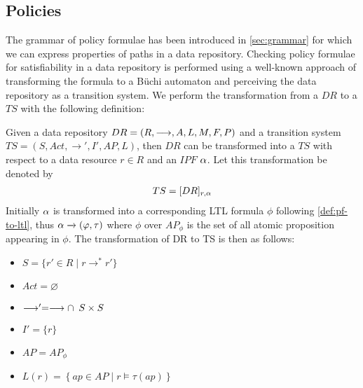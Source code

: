 \subsection{Policies}\label{sec:policies}
The grammar of policy formulae has been introduced in \autoref{sec:grammar} for which we can express properties of paths in a data repository. Checking policy formulae for satisfiability in a data repository is performed using a well-known approach of transforming the formula to a Büchi automaton and perceiving the data repository as a transition system. We perform the transformation from a $DR$ to a $TS$ with the following definition:
\begin{definition}\label{def:dr-to-ts}
Given a data repository $DR= \left( R, \longrightarrow, A, L, M, F, P \right)$ and a transition system $TS=\left(S, Act, \longrightarrow', I', AP, L \right)$, then $DR$ can be transformed into a $TS$ with respect to a data resource $r \in R$ and an $IPF$ $\alpha$. Let this transformation be denoted by
\begin{align*}
    TS = [DR]_{r,\alpha}    
\end{align*}
Initially $\alpha$ is transformed into a corresponding LTL formula $\phi$ following \autoref{def:pf-to-ltl}, thus $\alpha \xrightarrow{} \left(\varphi, \tau\right)$ where $\phi$ over $AP_\phi$ is the set of all atomic proposition appearing in $\phi$. The transformation of DR to TS is then as follows:
\begin{itemize}
  \item $S = \{ r' \in R \mid r \longrightarrow^\ast r' \}$
  \item $Act = \varnothing$
  \item $\longrightarrow' = \longrightarrow \cap \enskip S \times S$
  \item $I' = \{r\}$
  \item $AP = AP_\phi$
  \item $L(r) = \left\{ ap \in AP \mid r \models \tau(ap) \right\}$
\end{itemize}
\end{definition}

